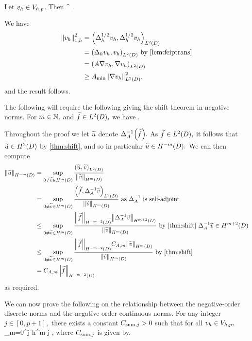\label{lem:h1contdisc}
Let $v_{h} \in V_{h,p}$. Then
\beqs
\SNHoD{\vh} \leq \Amin^{\half} \Noh{\vh}.
\eeqs
\ele

We have
\begin{align*}
\Noh{\vh}^2 &= \IPLtD{\Deltahh \vh}{\Deltahh \vh}\\
&= \IPLtD{\Deltah \vh}{\vh} \text{ by \cref{lem:feiptrans}}\\
&= \IPLtD{A \grad \vh}{\grad \vh}\\
&\geq \Amin \NLtD{\grad \vh}^2,
\end{align*}
and the result follows.
\epf

The following  will require the following  giving the shift theorem in negative norms.
\label{lem:shiftnegative}
For $m \in \mathbb N,$ and $\ftilde \in \LtD,$ we have
\beqs
\NHmmD{\DeltaAI\mleft(\ftilde\mright)} \leq \CAm \NHmmmtD{\ftilde}.
\eeqs
\ele

Throughout the proof we let $\widetilde{u}$ denote $\DeltaAI\mleft(\ftilde\mright).$ As $\ftilde \in \LtD,$ it follows that $\utilde \in \HtD$ by \cref{thm:shift}, and so in particular $\utilde \in \HmmD.$ We can then compute
\begin{align*}
\NHmmD{\utilde} &= \sup_{0 \neq \vtilde \in \HmD} \frac{\IPLtD{\utilde}{\vtilde}}{\NHmD{\vtilde}}\\
&= \sup_{0 \neq \vtilde \in \HmD} \frac{\IPLtD{\ftilde}{\DeltaAI\vtilde}}{\NHmD{\vtilde}}\text{ as } \DeltaAI \text{ is self-adjoint}\\
&\leq \sup_{0 \neq \vtilde \in \HmD} \frac{\NHmmmtD{\ftilde}\NHmptD{\DeltaAI\vtilde}}{\NHmD{\vtilde}} \text{ by \cref{thm:shift} } \DeltaAI\vtilde \in \HmptD\\
&\leq \sup_{0 \neq \vtilde \in \HmD} \frac{\NHmmmtD{\ftilde}\CAm\NHmD{\vtilde}}{\NHmD{\vtilde}} \text{ by \cref{thm:shift}}\\
&= \CAm \NHmmmtD{\ftilde}
\end{align*}
as required.
\epf

We can now prove the following  on the relationship between the negative-order discrete norms and the negative-order continuous norms.
\label{lem:negdiscsum}
For any integer $j \in [0,p+1],$ there exists a constant $C_{\mathrm{sum},j} > 0$ such that for all $v_{h} \in V_{h,p},$
\beqs
\Nmjh{\vh} \leq \Csumj \sum_{m=0}^j h^{m-j} \NHmmD{\vh},
\eeqs
where $C_{\mathrm{sum},j}$ is given by.
\ele

